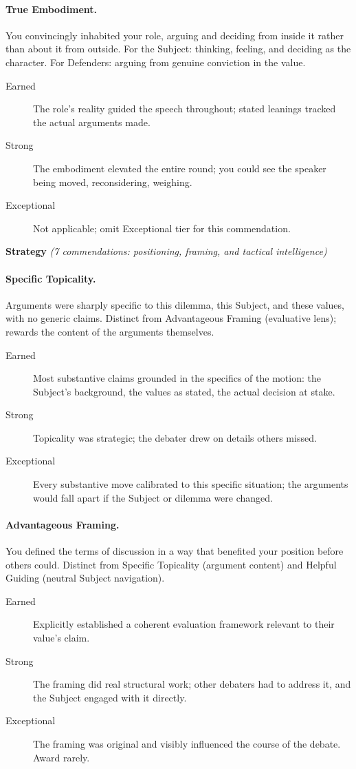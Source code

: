 \paragraph{True Embodiment.} You convincingly inhabited your role, arguing and deciding from inside it rather than about it from outside. For the Subject: thinking, feeling, and deciding as the character. For Defenders: arguing from genuine conviction in the value.
\begin{description}
    \item[Earned] The role's reality guided the speech throughout; stated leanings tracked the actual arguments made.
    \item[Strong] The embodiment elevated the entire round; you could see the speaker being moved, reconsidering, weighing.
    \item[Exceptional] Not applicable; omit Exceptional tier for this commendation.
\end{description}

\medskip
\noindent\textbf{Strategy} \textit{(7 commendations: positioning, framing, and tactical intelligence)}

\paragraph{Specific Topicality.} Arguments were sharply specific to this dilemma, this Subject, and these values, with no generic claims. Distinct from Advantageous Framing (evaluative lens); rewards the content of the arguments themselves.
\begin{description}
    \item[Earned] Most substantive claims grounded in the specifics of the motion: the Subject's background, the values as stated, the actual decision at stake.
    \item[Strong] Topicality was strategic; the debater drew on details others missed.
    \item[Exceptional] Every substantive move calibrated to this specific situation; the arguments would fall apart if the Subject or dilemma were changed.
\end{description}

\paragraph{Advantageous Framing.} You defined the terms of discussion in a way that benefited your position before others could. Distinct from Specific Topicality (argument content) and Helpful Guiding (neutral Subject navigation).
\begin{description}
    \item[Earned] Explicitly established a coherent evaluation framework relevant to their value's claim.
    \item[Strong] The framing did real structural work; other debaters had to address it, and the Subject engaged with it directly.
    \item[Exceptional] The framing was original and visibly influenced the course of the debate. Award rarely.
\end{description}

